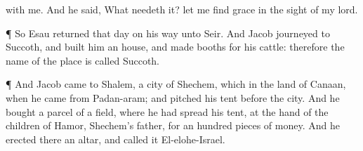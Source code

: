 {{} with me. And he
said,
What needeth it? let me
find
grace in the
sight of my
lord.
\par }{\PP {}¶ So
Esau
returned that
day on his
way unto
Seir.
And
Jacob
journeyed to
Succoth, and
built him an
house, and
made
booths for his
cattle: therefore the
name of the
place is
called
Succoth.
\par }{\PP {}¶ And
Jacob
came to
Shalem, a
city of
Shechem, which
{} in the
land of
Canaan, when he
came from
Padan-aram; and pitched his
tent
before the
city.
And he
bought a
parcel of a
field, where he had
spread his
tent, at the
hand of the
children of
Hamor,
Shechem’s
father, for an
hundred pieces of
money.
And he
erected there an
altar, and called
it
El-elohe-Israel.

}
